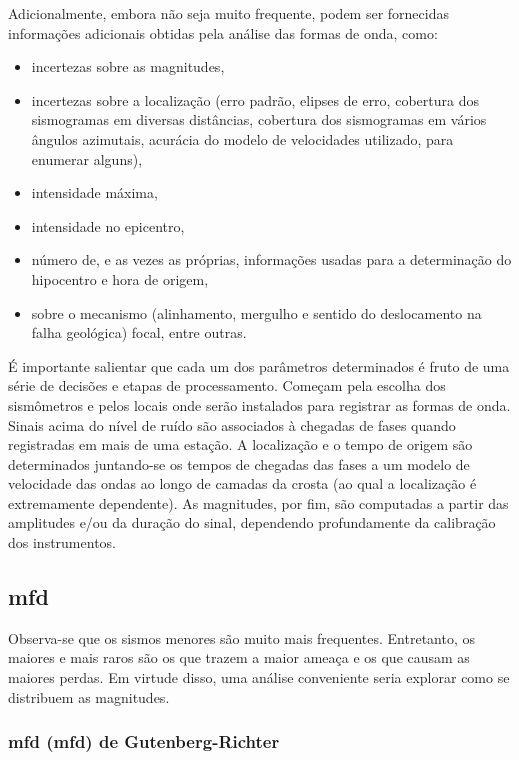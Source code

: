 Adicionalmente, embora não seja muito frequente, podem ser fornecidas informações adicionais obtidas pela análise das
formas de onda, como:

\begin{itemize}\setlength{\itemsep}{0em}
	\item incertezas sobre as magnitudes,
	\item incertezas sobre a localização (erro padrão, elipses de erro, cobertura dos sismogramas em diversas distâncias, cobertura
	dos sismogramas em vários ângulos azimutais, acurácia do modelo de velocidades utilizado, para enumerar alguns),
	\item intensidade máxima,
	\item intensidade no epicentro,
	\item número de, e as vezes as próprias, informações usadas para a determinação do hipocentro e hora de origem,
	\item sobre o mecanismo (alinhamento, mergulho e sentido do deslocamento na falha geológica) focal, entre outras.
\end{itemize} 

É importante salientar \citep{woessner_2010} que cada um dos parâmetros determinados é fruto de uma série de decisões
e etapas de processamento. Começam pela escolha dos sismômetros e pelos locais onde serão instalados para registrar as
formas de onda. Sinais acima do nível de ruído são associados à chegadas de fases quando registradas em mais de uma estação. 
A localização e o tempo de origem são determinados juntando-se os tempos de chegadas das fases a um modelo de velocidade
das ondas ao longo de camadas da crosta (ao qual a localização é extremamente dependente). As magnitudes, por fim, são
computadas a partir das amplitudes e/ou da duração do sinal, dependendo profundamente da calibração dos instrumentos.



\subsection{\glsdesc{mfd}}
\label{sec:mfd}

Observa-se que os sismos menores são muito mais frequentes.
Entretanto, os maiores e mais raros são os que trazem a maior ameaça e os que causam as maiores perdas.
Em virtude disso, uma análise conveniente seria explorar como se distribuem as magnitudes.

\subsubsection{\glsdesc*{mfd} (\gls{mfd}) de Gutenberg-Richter}
\label{sec:grmfd}

